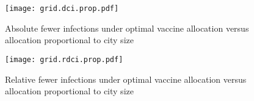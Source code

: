 \begin{figure}[h]
  \texttt{[image: grid.dci.prop.pdf]}
  \caption{Absolute fewer infections under optimal vaccine allocation
    versus allocation proportional to city size}
  \label{fig:grid.dci.prop}
  \floatfoot\gridfoot
\end{figure}
\begin{figure}[h]
  \texttt{[image: grid.rdci.prop.pdf]}
  \caption{Relative fewer infections under optimal vaccine allocation
    versus allocation proportional to city size}
  \label{fig:grid.rdci.prop}
  \floatfoot\gridfoot
\end{figure}